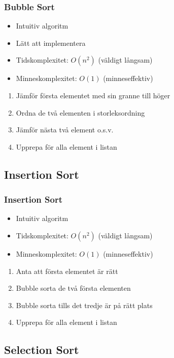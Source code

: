 \documentclass[aspectratio=169]{beamer}
\begin{document}
\begin{frame}
	\frametitle{Bubble Sort}
	
	\begin{itemize}
		\item Intuitiv algoritm
		\item Lätt att implementera
		\item Tidskomplexitet: \(O(n^2)\) (väldigt långsam)
		\item Minneskomplexitet: \(O(1)\) (minneseffektiv)
	\end{itemize}
	
	\begin{enumerate}
		\item Jämför första elementet med sin granne till höger
		\item Ordna de två elementen i storleksordning
		\item Jämför nästa två element o.s.v.
		\item Upprepa för alla element i listan
	\end{enumerate}
	
\end{frame}

\subsection{Insertion Sort}

\begin{frame}
	\frametitle{Insertion Sort}
	
	\begin{itemize}
		\item Intuitiv algoritm
		\item Tidskomplexitet: \(O(n^2)\) (väldigt långsam)
		\item Minneskomplexitet: \(O(1)\) (minneseffektiv)
	\end{itemize}
	
	\begin{enumerate}
		\item Anta att första elementet är rätt
		\item Bubble sorta de två första elementen
		\item Bubble sorta tills det tredje är på rätt plats 
		\item Upprepa för alla element i listan
	\end{enumerate}
	
\end{frame}

\subsection{Selection Sort}
\end{document}

